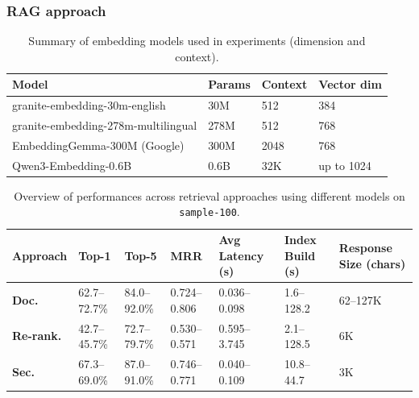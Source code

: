 \documentclass[10pt,aspectratio=169]{beamer}
\begin{document}
\begin{frame}
  \frametitle{RAG approach}

  \begin{table}
    \scriptsize
    \centering
    \caption{Summary of embedding models used in experiments
    (dimension and context).}\label{tab:embedding-summary}
    \begin{tabularx}{\textwidth}{Xlll}
      \toprule
      \textbf{Model} & \textbf{Params} & \textbf{Context} &
      \textbf{Vector dim} \\
      \midrule
      granite-embedding-30m-english & 30M & 512 & 384 \\
      granite-embedding-278m-multilingual & 278M & 512 & 768 \\
      EmbeddingGemma-300M (Google) & 300M & 2048 & 768 \\
      Qwen3-Embedding-0.6B & 0.6B & 32K & up to 1024 \\
      \bottomrule
    \end{tabularx}
  \end{table}

    \begin{table}[h]
      \centering
      \scriptsize
      \caption{Overview of performances across retrieval approaches using different models on \texttt{sample-100}.}
      \begin{tabularx}{\textwidth}{llllYYY}
        \toprule
        \textbf{Approach}    & \textbf{Top-1} & \textbf{Top-5} & \textbf{MRR} & \textbf{Avg Latency (s)} & \textbf{Index Build (s)} & \textbf{Response Size (chars)} \\
        \midrule
        \textbf{Doc.}     & 62.7--72.7\% & 84.0--92.0\%  & 0.724--0.806 & 0.036--0.098 & 1.6--128.2  & 62--127K \\
        \textbf{Re-rank.} & 42.7--45.7\% & 72.7--79.7\%  & 0.530--0.571 & 0.595--3.745 & 2.1--128.5  & 6K        \\
        \textbf{Sec.}     & 67.3--69.0\% & 87.0--91.0\%  & 0.746--0.771 & 0.040--0.109 & 10.8--44.7  & 3K        \\
        \bottomrule
      \end{tabularx}\label{tab:overview-by-approach-scale}
    \end{table}

\end{frame}
\end{document}
